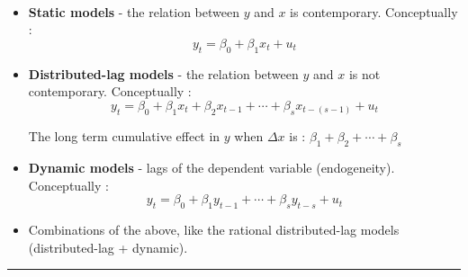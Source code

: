 	\begin{f}{\ }
		

	\begin{itemize}[leftmargin=*]
		\item \textbf{Static models} - the relation between \(y\) and \(x\) is contemporary. Conceptually :
\[y_{t} = \beta_{0} + \beta_{1} x_{t} + u_{t}\]
		
		\item \textbf{Distributed-lag models} - the relation between \(y\) and \(x\) is not contemporary. Conceptually :
\[y_{t} = \beta_{0} + \beta_{1} x_{t} + \beta_{2} x_{t - 1} + \cdots + \beta_{s} x_{t - (s - 1)} + u_{t}\]
		
		The long term cumulative effect in \(y\) when \(\Delta x\) is :
			\(\beta_{1} + \beta_{2} + \cdots + \beta_{s}\)
		
		\item \textbf{Dynamic models} - lags of the dependent variable (endogeneity). Conceptually :
\[y_{t} = \beta_{0} + \beta_{1} y_{t - 1} + \cdots + \beta_{s} y_{t - s} + u_{t}\]
		
		\item Combinations of the above, like the rational distributed-lag models (distributed-lag + dynamic).
	\end{itemize}	

\end{f} 
 \hrule 
 
